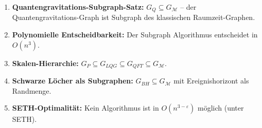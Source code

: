﻿\documentclass[a4paper,12pt]{article}
\theoremstyle{definition}
\begin{document}
\begin{enumerate}
	\item \textbf{Quantengravitations-Subgraph-Satz:}
	      $G_Q \subseteq G_{\mathcal{M}}$ -- der Quantengravitations-Graph
	      ist Subgraph des klassischen Raumzeit-Graphen.
	\item \textbf{Polynomielle Entscheidbarkeit:} Der Subgraph Algorithmus
	      entscheidet in $O(n^3)$.
	\item \textbf{Skalen-Hierarchie:}
	      $G_P \subseteq G_{LQG} \subseteq G_{QFT} \subseteq G_{\mathcal{M}}$.
	\item \textbf{Schwarze L\"ocher als Subgraphen:}
	      $G_{BH} \subseteq G_{\mathcal{M}}$ mit Ereignishorizont als Randmenge.
	\item \textbf{SETH-Optimalit\"at:} Kein Algorithmus ist in $O(n^{3-\varepsilon})$
	      m\"oglich (unter SETH).
\end{enumerate}
\end{document}
